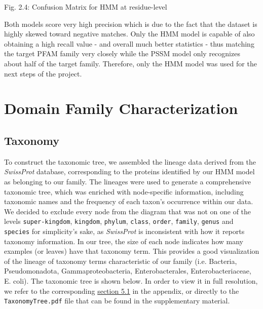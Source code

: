 \documentclass[10pt,twocolumn,letterpaper]{article}
\begin{document}
\begin{center}
    \small{Fig. 2.4: Confusion Matrix for HMM at residue-level}
\end{center}

Both models score very high precision which is due to the fact that the dataset is highly skewed toward negative matches. Only the HMM model is capable of also obtaining a high recall value - and overall much better statistics - thus matching the target PFAM family very closely while the PSSM model only recognizes about half of the target family. Therefore, only the HMM model was used for the next steps of the project.

\section{Domain Family Characterization}

\subsection{Taxonomy}

To construct the taxonomic tree, we assembled the lineage data derived from the \textit{SwissProt} database, corresponding to the proteins identified by our HMM model as belonging to our family. The lineages were used to generate a comprehensive taxonomic tree, which was enriched with node-specific information, including taxonomic names and the frequency of each taxon's occurrence within our data. We decided to exclude every node from the diagram that was not on one of the levels \texttt{super-kingdom}, \texttt{kingdom}, \texttt{phylum}, \texttt{class}, \texttt{order}, \texttt{family}, \texttt{genus} and \texttt{species} for simplicity's sake, as \textit{SwissProt} is inconsistent with how it reports taxonomy information. In our tree, the size of each node indicates how many examples (or leaves) have that taxonomy term. This provides a good visualization of the lineage of taxonomy terms characteristic of our family (i.e. Bacteria, Pseudomonadota, Gammaproteobacteria, Enterobacterales, Enterobacteriaceae, E. coli). 
The taxonomic tree is shown below. In order to view it in full resolution, we refer to the corresponding \hyperref[sec:taxtree]{section 5.1} in the appendix, or directly to the \texttt{TaxonomyTree.pdf} file that can be found in the supplementary material.
\end{document}
